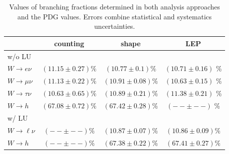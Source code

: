 \begin{table}[htb!]
    \centering
    \setlength{\tabcolsep}{1.5em}
    \renewcommand{\arraystretch}{1.5}
    \caption{Values of branching fractions determined in both
        analysis approaches and the PDG values.  Errors combine
        statistical and systematics uncertainties.
    \label{tab:results}}
    \begin{tabular}{l|ccc}
                           & counting              & shape                 & LEP \\
    \hline                                                                 
    w/o LU &&& \\
    \hline
    $W\rightarrow e\nu$    & $(11.15 \pm 0.27) \%$ & $(10.77 \pm 0.1) \%$  & $(10.71 \pm 0.16)$ \% \\
    $W\rightarrow \mu\nu$  & $(11.13 \pm 0.22) \%$ & $(10.91 \pm 0.08) \%$ & $(10.63 \pm 0.15)$ \% \\
    $W\rightarrow \tau\nu$ & $(10.63 \pm 0.65) \%$ & $(10.89 \pm 0.21) \%$ & $(11.38 \pm 0.21)$ \% \\
    $W\rightarrow h$       & $(67.08 \pm 0.72) \%$ & $(67.42 \pm 0.28) \%$ & $(-- \pm --)$ \% \\
    \hline
    w/ LU &&& \\
    \hline
    $W\rightarrow \ell\nu$ & $(-- \pm --)\%$       & $(10.87 \pm 0.07)\%$  & $(10.86 \pm 0.09)\%$  \\
    $W\rightarrow h$       & $(-- \pm --)\%$       & $(67.38 \pm 0.22)\%$  & $(67.41 \pm 0.27)\%$  \\
    \end{tabular}
\end{table}


\begin{table}[htb!]
    \centering
    \renewcommand{\arraystretch}{1.5}
    \caption{Correlation matrix of leptonic branching fractions.}
    \label{tab:results_corr}
\end{table}




